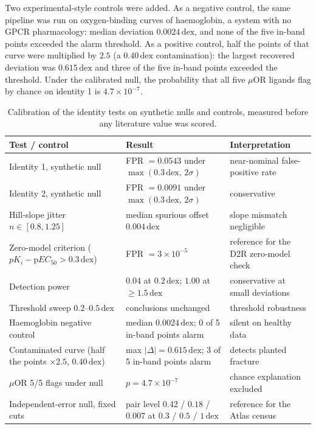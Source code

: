 ﻿\documentclass[11pt,a4paper]{article}
\newcommand{\dex}{\ensuremath{\,\mathrm{dex}}}
\newcommand{\pKi}{\ensuremath{p\!K_{i}}}
\begin{document}
Two experimental-style controls were added. As a negative control, the same pipeline was run on oxygen-binding curves of haemoglobin, a system with no GPCR pharmacology: median deviation $0.0024\dex$, and none of the five in-band points exceeded the alarm threshold. As a positive control, half the points of that curve were multiplied by $2.5$ (a $0.40\dex$ contamination): the largest recovered deviation was $0.615\dex$ and three of the five in-band points exceeded the threshold. Under the calibrated null, the probability that all five $\mu$OR ligands flag by chance on identity 1 is $4.7\times10^{-7}$.

\begin{table}[!htbp]
\centering
\caption{Calibration of the identity tests on synthetic nulls and controls, measured before any literature value was scored.}
\label{tab:calibration}
\small
\begin{tabular}{@{}p{6.1cm}p{5.0cm}p{4.0cm}@{}}
\toprule
Test / control & Result & Interpretation \\
\midrule
Identity 1, synthetic null & FPR $=0.0543$ under $\max(0.3\dex,\,2\sigma)$ & near-nominal false-positive rate \\
Identity 2, synthetic null & FPR $=0.0091$ under $\max(0.3\dex,\,2\sigma)$ & conservative \\
Hill-slope jitter $n\in[0.8,1.25]$ & median spurious offset $0.004\dex$ & slope mismatch negligible \\
Zero-model criterion ($\pKi-\mathrm{p}EC_{50}>0.3\dex$) & FPR $=3\times10^{-5}$ & reference for the D2R zero-model check \\
Detection power & $0.04$ at $0.2\dex$; $1.00$ at $\geq1.5\dex$ & conservative at small deviations \\
Threshold sweep $0.2$--$0.5\dex$ & conclusions unchanged & threshold robustness \\
Haemoglobin negative control & median $0.0024\dex$; 0 of 5 in-band points alarm & silent on healthy data \\
Contaminated curve (half the points $\times2.5$, $0.40\dex$) & max $|\Delta|=0.615\dex$; 3 of 5 in-band points alarm & detects planted fracture \\
$\mu$OR 5/5 flags under null & $p=4.7\times10^{-7}$ & chance explanation excluded \\
Independent-error null, fixed cuts & pair level $0.42$ / $0.18$ / $0.007$ at $0.3$ / $0.5$ / $1\dex$ & reference for the Atlas census \\
\bottomrule
\end{tabular}
\end{table}
\end{document}
